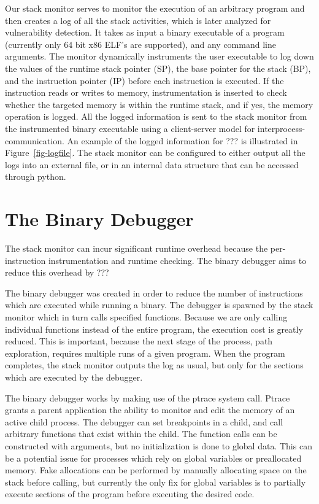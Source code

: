 \documentclass{article}
\begin{document}
    Our stack monitor serves to monitor the execution of an arbitrary program and
then creates a log of all the stack activities, which is later analyzed for
vulnerability detection.  It takes as input a binary executable of a program
(currently only 64 bit x86 ELF's are supported), and any command line arguments.
The monitor dynamically instruments the user executable to log down the values of 
the runtime stack pointer (SP), the base pointer for the stack (BP), and the instruction pointer
(IP) before each instruction is executed.
If the instruction reads or writes to memory, instrumentation is inserted to check
whether the targeted memory is within the runtime stack, and if yes, the memory operation is logged.
All the logged information is sent to the stack monitor from the instrumented binary executable
using a client-server model for interprocess-communication. 
An example of the logged information for ??? is illustrated in Figure~\ref{fig-logfile}.
The stack monitor can be configured to either output all the logs into an external file,
or in an internal data structure that can be accessed through python. 


\section{The Binary Debugger}

The stack monitor can incur significant runtime overhead because the per-instruction 
instrumentation and runtime checking.
The binary debugger aims to reduce this overhead by ???

The binary debugger was created in order to reduce the number of instructions
which are executed while running a binary.
The debugger is spawned by the stack monitor which in turn calls specified
functions. Because we are only calling individual functions instead of the
entire program, the execution cost is greatly reduced. This is important,
because the next stage of the process, path exploration, requires multiple runs
of a given program. When the program completes, the stack monitor outputs the
log as usual, but only for the sections which are executed by the debugger.

The binary debugger works by making use of the ptrace system call. Ptrace grants
a parent application the ability to monitor and edit the memory of an active
child process. The debugger can set breakpoints in a child, and call arbitrary
functions that exist within the child. The function calls can be constructed
with arguments, but no initialization is done to global data.  This can be a
potential issue for processes which rely on global variables or preallocated
memory. Fake allocations can be performed by manually allocating space on the
stack before calling, but currently the only fix for global variables is to
partially execute sections of the program before executing the desired code.
\end{document}
